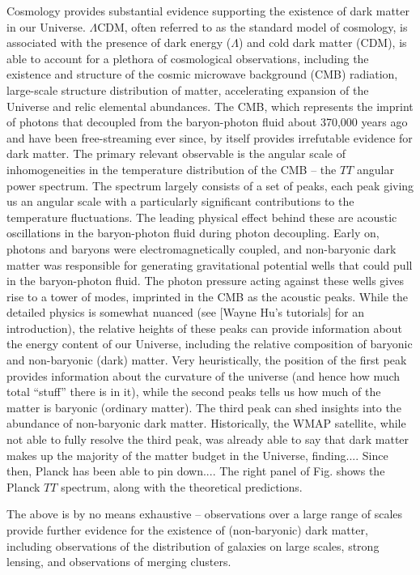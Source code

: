 Cosmology provides substantial evidence supporting the existence of dark matter in our Universe. $\Lambda$CDM, often referred to as the standard model of cosmology, is associated with the presence of dark energy ($\Lambda$) and cold dark matter (CDM), is able to account for a plethora of cosmological observations, including the existence and structure of the cosmic microwave background (CMB) radiation, large-scale structure distribution of matter, accelerating expansion of the Universe and relic elemental abundances. The CMB, which represents the imprint of photons that decoupled from the baryon-photon fluid about 370,000 years ago and have been free-streaming ever since, by itself provides irrefutable evidence for dark matter. The primary relevant observable is the angular scale of inhomogeneities in the temperature distribution of the CMB -- the $TT$ angular power spectrum. The spectrum largely consists of a set of peaks, each peak giving us an angular scale with a particularly significant contributions to the temperature fluctuations. The leading physical effect behind these are acoustic oscillations in the baryon-photon fluid during photon decoupling. Early on, photons and baryons were electromagnetically coupled, and non-baryonic dark matter was responsible for generating gravitational potential wells that could pull in the baryon-photon fluid. The photon pressure acting against these wells gives rise to a tower of modes, imprinted in the CMB as the acoustic peaks. While the detailed physics is somewhat nuanced (see [Wayne Hu's tutorials] for an introduction), the relative heights of these peaks can provide information about the energy content of our Universe, including the relative composition of baryonic and non-baryonic (dark) matter. Very heuristically, the position of the first peak provides information about the curvature of the universe (and hence how much total ``stuff'' there is in it), while the second peaks tells us how much of the matter is baryonic (ordinary matter). The third peak can shed insights into the abundance of non-baryonic dark matter. Historically, the WMAP satellite, while not able to fully resolve the third peak, was already able to say that dark matter makes up the majority of the matter budget in the Universe, finding.... Since then, Planck has been able to pin down.... The right panel of Fig. shows the Planck $TT$ spectrum, along with the theoretical predictions.

The above is by no means exhaustive -- observations over a large range of scales provide further evidence for the existence of (non-baryonic) dark matter, including observations of the distribution of galaxies on large scales, strong lensing, and observations of merging clusters.

